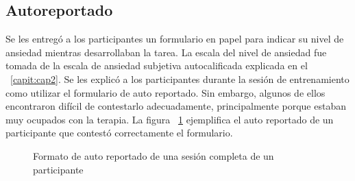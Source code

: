 	\subsection{Autoreportado}
	Se les entreg\'o a los participantes un formulario en papel para indicar su nivel de ansiedad mientras desarrollaban la tarea. La escala del nivel de ansiedad fue tomada de la escala de ansiedad subjetiva autocalificada explicada en el ~\ref{capit:cap2}. Se les explic\'o a los participantes durante la sesi\'on de entrenamiento como utilizar el formulario de auto reportado. Sin embargo, algunos de ellos encontraron dif\'icil de contestarlo adecuadamente, principalmente porque estaban muy ocupados con la terapia. La figura ~\ref{fig:imggtlabel} ejemplifica el auto reportado de un participante que contest\'o correctamente el formulario.
	\begin{figure}[h!]
		\centering
		\caption{Formato de auto reportado de una sesi\'on completa de un participante}\label{fig:imggtlabel}
	\end{figure}


